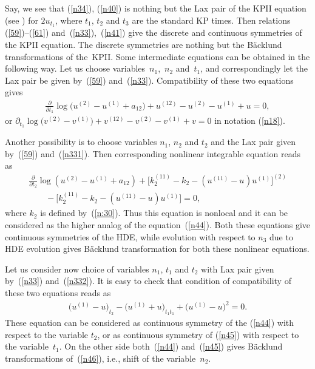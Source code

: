 \documentclass[pdftex]{sigma}
\numberwithin{equation}{section}
\begin{document}
 Say, we see that (\ref{n34}), (\ref{n40}) is nothing but the Lax pair of the KPII equation (see \cite{Dryuma, Kadomtsev/Petviashvili1970, Zakharov/Shabat}) for $2u_{t_1}$, where $t_1$, $ t_2$ and $t_3$ are the standard KP times. Then relations \mbox{(\ref{59})--(\ref{61})} and~(\ref{n33}),~(\ref{n41}) give the discrete and continuous symmetries of the KPII equation. The discrete symmetries are nothing but the B{\"a}cklund transformations of the~KPII. Some intermediate equations can be obtained in the following way. Let us choose variables~$n_1$,~$n_2$ and~$t_1$, and correspondingly let the Lax pair be given by~(\ref{59}) and~(\ref{n33}). Compatibility of these two equations gives{\samepage
\begin{gather}
 \frac{\partial}{\partial t_1}\log\big(u^{(2)}-u^{(1)}+a_{12}\big)+u^{(12)}-u^{(2)}-u^{(1)}+u=0,\label{n44}
\end{gather}
or $\partial_{t_1}\log\big(v^{(2)}-v^{(1)}\big)+v^{(12)}-v^{(2)}-v^{(1)}+v=0$ in notation (\ref{n18}).}

Another possibility is to choose variables $n_1$, $n_2$ and $t_2$ and the Lax pair given by~(\ref{59}) and~(\ref{n331}). Then corresponding nonlinear integrable equation reads as
\begin{gather}
 \frac{\partial}{\partial t_2}\log(u^{(2)}-u^{(1)}+a_{12}) +\big[k_{2}^{(11)}-k_{2}^{} -(u^{(11)}-u^{})u^{(1)}\big]^{(2)} \nonumber\\
\qquad {} -\big[k_{2}^{(11)}-k_{2}^{}-(u^{(11)}-u^{})u^{(1)}\big]=0,\label{n45}
\end{gather}
where $k_2$ is def\/ined by~(\ref{n:30}). Thus this equation is nonlocal and it can be considered as the higher analog of the equation~(\ref{n44}). Both these equations give continuous symmetries of the HDE, while evolution with respect to $n_3$ due to HDE evolution gives B{\"a}cklund transformation for both these nonlinear equations.

Let us consider now choice of variables $n_1$, $t_1$ and $t_2$ with Lax pair given by~(\ref{n33}) and~(\ref{n332}). It is easy to check that condition of compatibility of these two equations reads as
\begin{gather}
 \big(u^{(1)}-u\big)_{t_2}-\big(u^{(1)}+u\big)_{t_1t_1}+\big(u^{(1)}-u\big)^{2}=0.\label{n46}
\end{gather}
These equation can be considered as continuous symmetry of the (\ref{n44}) with respect to the variable $t_2$, or as continuous symmetry of (\ref{n45}) with respect to the variable~$t_1$. On the other side both~(\ref{n44}) and~(\ref{n45}) gives B{\"a}cklund transformations of~(\ref{n46}), i.e., shift of the variable~$n_2$.
\end{document}
